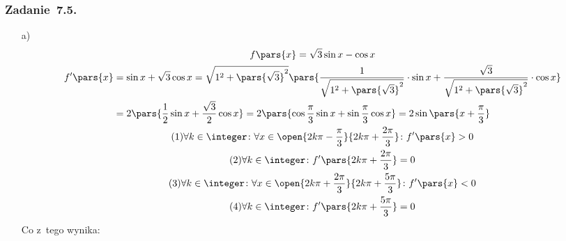 \subsubsection*{Zadanie~7.5.}
\begin{itemize}
    \item[a)]
        \begin{gather*}
            f\pars{x} = \sqrt{3}\sin x - \cos x\\
            \begin{split}
                f'\pars{x}
                    &= \sin x + \sqrt{3}\cos x
                    = \sqrt{1^2 + \pars{\sqrt{3}}^2}\pars{\frac{1}{\sqrt{1^2 + \pars{\sqrt{3}}^2}}\cdot \sin x + \frac{\sqrt{3}}{\sqrt{1^2 + \pars{\sqrt{3}}^2}} \cdot \cos x}\\
                    &= 2\pars{\frac{1}{2}\sin x + \frac{\sqrt{3}}{2}\cos x} = 2\pars{\cos\frac{\pi}{3}\sin x + \sin\frac{\pi}{3}\cos x}
                    = 2\sin\pars{x + \frac{\pi}{3}}
            \end{split}\\
            \tag{\(1\)} \forall k \in \integer\colon \forall x \in \open{2k\pi - \frac{\pi}{3}}{2k\pi + \frac{2\pi}{3}}\colon f'\pars{x} > 0 \label{2020_10_20:7_5:a:increase}\\
            \tag{\(2\)} \forall k \in \integer\colon f'\pars{2k\pi + \frac{2\pi}{3}} = 0 \label{2020_10_20:7_5:a:first_zero}\\
            \tag{\(3\)} \forall k \in \integer\colon \forall x \in \open{2k\pi + \frac{2\pi}{3}}{2k\pi + \frac{5\pi}{3}}\colon f'\pars{x} < 0 \label{2020_10_20:7_5:a:decrease}\\
            \tag{\(4\)} \forall k \in \integer\colon f'\pars{2k\pi + \frac{5\pi}{3}} = 0 \label{2020_10_20:7_5:a:second_zero}
        \end{gather*}
        Co z~tego wynika:
\end{itemize}
